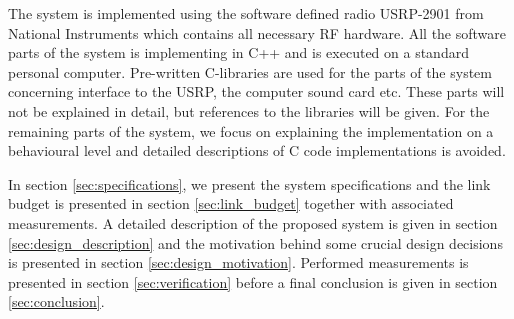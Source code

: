 The system is implemented using the software defined radio USRP-2901\cite{USRP2901} from National Instruments which contains all necessary RF hardware. All the software parts of the system is implementing in C++ and is executed on a standard personal computer. Pre-written C-libraries are used for the parts of the system concerning interface to the USRP, the computer sound card etc. These parts will not be explained in detail, but references to the libraries will be given. For the remaining parts of the system, we focus on explaining the implementation on a behavioural level and detailed descriptions of C code implementations is avoided. 

In section \ref{sec:specifications}, we present the system specifications and the link budget is presented in section \ref{sec:link_budget} together with associated measurements. A detailed description of the proposed system is given in section \ref{sec:design_description} and the motivation behind some crucial design decisions is presented in section \ref{sec:design_motivation}. Performed measurements is presented in section \ref{sec:verification} before a final conclusion is given in section \ref{sec:conclusion}.